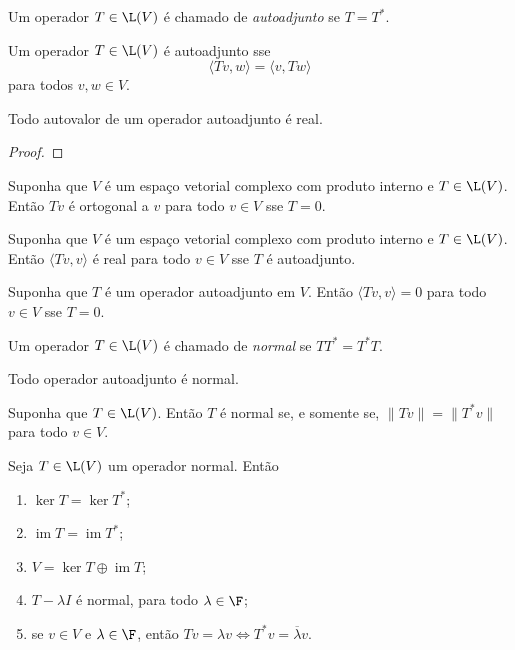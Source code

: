 \documentclass{article}
\DeclareMathOperator{\im}{im}
\begin{document}
\begin{defn}
    Um operador \(T \in \L(V)\) é chamado de \emph{autoadjunto} se \(T = T^*\).
\end{defn}

\begin{rem}
    Um operador \(T \in \L(V)\) é autoadjunto sse
    \[
        \langle Tv, w \rangle = \langle v, Tw \rangle
    \]
    \noindent para todos \(v, w \in V\).
\end{rem}

\begin{prop}
    Todo autovalor de um operador autoadjunto é real.
\end{prop}

\begin{proof}
    
\end{proof}

\begin{prop}
    Suponha que \(V\) é um espaço vetorial complexo com produto interno e \(T \in \L(V)\). Então \(Tv\) é ortogonal a \(v\) para todo \(v \in V\) sse \(T = 0\).
\end{prop}

\begin{prop}
    Suponha que \(V\) é um espaço vetorial complexo com produto interno e \(T \in \L(V)\). Então \(\langle Tv, v \rangle\) é real para todo \(v \in V\) sse \(T\) é autoadjunto.
\end{prop}

\begin{prop}
    Suponha que \(T\) é um operador autoadjunto em \(V\). Então \(\langle Tv, v \rangle = 0\) para todo \(v \in V\) sse \(T = 0\).
\end{prop}

\begin{defn}
    Um operador \(T \in \L(V)\) é chamado de \emph{normal} se \(T T^* = T^* T\).
\end{defn}

\begin{rem}
    Todo operador autoadjunto é normal.
\end{rem}

\begin{prop}
    Suponha que \(T \in \L(V)\). Então \(T\) é normal se, e somente se, \(\|Tv\| = \|T^* v\|\) para todo \(v \in V\).
\end{prop}

\begin{prop} 
    Seja \(T \in \L(V)\) um operador normal. Então
    \begin{enumerate}
        \item [(a)] \(\ker T = \ker T^*\);
        \item [(b)] \(\im T = \im T^*\);
        \item [(c)] \(V = \ker T \oplus \im T\);
        \item [(d)] \(T - \lambda I\) é normal, para todo \(\lambda \in \F\);
        \item [(e)] se \(v \in V\) e \(\lambda \in \F\), então \(Tv = \lambda v \iff T^* v = \overline{\lambda} v\).
    \end{enumerate}
\end{prop}
\end{document}
